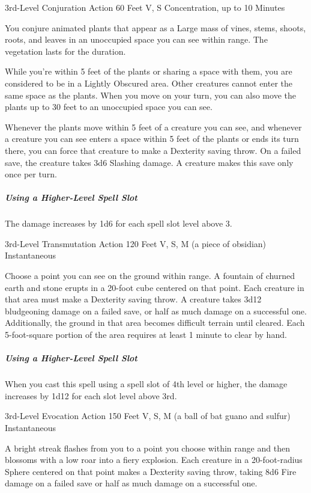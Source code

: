 \documentclass[letterpaper,openany,oneside,twocolumn]{book}
\begin{document}
	{3rd-Level Conjuration}
	{Action}
	{60 Feet}
	{V, S}
	{Concentration, up to 10 Minutes}

You conjure animated plants that appear as a Large mass of vines, stems, shoots, roots, and leaves in an unoccupied space you can see within range. The vegetation lasts for the duration.

While you're within 5 feet of the plants or sharing a space with them, you are considered to be in a Lightly Obscured area. Other creatures cannot enter the same space as the plants. When you move on your turn, you can also move the plants up to 30 feet to an unoccupied space you can see.

Whenever the plants move within 5 feet of a creature you can see, and whenever a creature you can see enters a space within 5 feet of the plants or ends its turn there, you can force that creature to make a Dexterity saving throw. On a failed save, the creature takes 3d6 Slashing damage. A creature makes this save only once per turn.

\subparagraph*{Using a Higher-Level Spell Slot} The damage increases by 1d6 for each spell slot level above 3.

	{3rd-Level Transmutation}
	{Action}
	{120 Feet}
	{V, S, M (a piece of obsidian)}
	{Instantaneous}

Choose a point you can see on the ground within range. A fountain of churned earth and stone erupts in a 20-foot cube centered on that point. Each creature in that area must make a Dexterity saving throw. A creature takes 3d12 bludgeoning damage on a failed save, or half as much damage on a successful one. Additionally, the ground in that area becomes difficult terrain until cleared. Each 5-foot-square portion of the area requires at least 1 minute to clear by hand.

\subparagraph*{Using a Higher-Level Spell Slot} When you cast this spell using a spell slot of 4th level or higher, the damage increases by 1d12 for each slot level above 3rd.

	{3rd-Level Evocation}
	{Action}
	{150 Feet}
	{V, S, M (a ball of bat guano and sulfur)}
	{Instantaneous}

A bright streak flashes from you to a point you choose within range and then blossoms with a low roar into a fiery explosion. Each creature in a 20-foot-radius Sphere centered on that point makes a Dexterity saving throw, taking 8d6 Fire damage on a failed save or half as much damage on a successful one.
\end{document}
